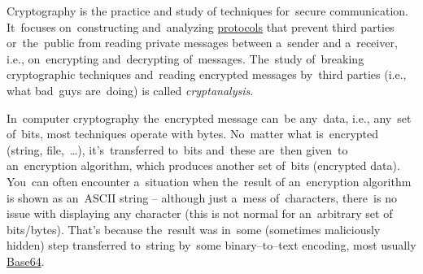 \label{cryptography}
Cryptography is the practice and study of techniques for~secure communication.
It~focuses on~constructing and~analyzing \hyperref[protocolstandard]{protocols} that prevent third parties or~the~public from reading private messages between a~sender and a~receiver, i.e., on~encrypting and~decrypting of~messages.
The~study of~breaking cryptographic techniques and~reading encrypted messages by~third parties (i.e., what bad~guys are~doing) is called \textit{cryptanalysis}.

In~computer cryptography the~encrypted message can~be any~data, i.e., any~set of~bits, most techniques operate with bytes.
No~matter what is~encrypted (string, file,~\dots), it's~transferred to~bits and~these are~then given~to an~encryption algorithm, which produces another set of~bits (encrypted data).
You~can often encounter a~situation when the~result of an~encryption algorithm is shown as an~ASCII string -- although just a~mess of~characters, there~is no issue with displaying any character (this is not normal for an~arbitrary set of bits/bytes).
That's because the~result was in~some (sometimes maliciously hidden) step transferred to~string by~some binary--to--text encoding, most usually \hyperref[base64]{Base64}.

